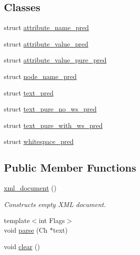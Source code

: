 \subsection*{Classes}
\begin{DoxyCompactItemize}
\item 
struct \mbox{\hyperlink{structrapidxml_1_1xml__document_1_1attribute__name__pred}{attribute\+\_\+name\+\_\+pred}}
\item 
struct \mbox{\hyperlink{structrapidxml_1_1xml__document_1_1attribute__value__pred}{attribute\+\_\+value\+\_\+pred}}
\item 
struct \mbox{\hyperlink{structrapidxml_1_1xml__document_1_1attribute__value__pure__pred}{attribute\+\_\+value\+\_\+pure\+\_\+pred}}
\item 
struct \mbox{\hyperlink{structrapidxml_1_1xml__document_1_1node__name__pred}{node\+\_\+name\+\_\+pred}}
\item 
struct \mbox{\hyperlink{structrapidxml_1_1xml__document_1_1text__pred}{text\+\_\+pred}}
\item 
struct \mbox{\hyperlink{structrapidxml_1_1xml__document_1_1text__pure__no__ws__pred}{text\+\_\+pure\+\_\+no\+\_\+ws\+\_\+pred}}
\item 
struct \mbox{\hyperlink{structrapidxml_1_1xml__document_1_1text__pure__with__ws__pred}{text\+\_\+pure\+\_\+with\+\_\+ws\+\_\+pred}}
\item 
struct \mbox{\hyperlink{structrapidxml_1_1xml__document_1_1whitespace__pred}{whitespace\+\_\+pred}}
\end{DoxyCompactItemize}
\subsection*{Public Member Functions}
\begin{DoxyCompactItemize}
\item 
\mbox{\hyperlink{classrapidxml_1_1xml__document_aae8841b15085ba8f32ff46587ace28f5}{xml\+\_\+document}} ()
\begin{DoxyCompactList}\small\item\em Constructs empty X\+ML document. \end{DoxyCompactList}\item 
{\footnotesize template$<$int Flags$>$ }\\void \mbox{\hyperlink{classrapidxml_1_1xml__document_ac6e73ff9ac323bf5a370c38feb03a6b1}{parse}} (Ch $\ast$text)
\item 
void \mbox{\hyperlink{classrapidxml_1_1xml__document_a826929ff54242532198701f19ff5f83f}{clear}} ()
\end{DoxyCompactItemize}
